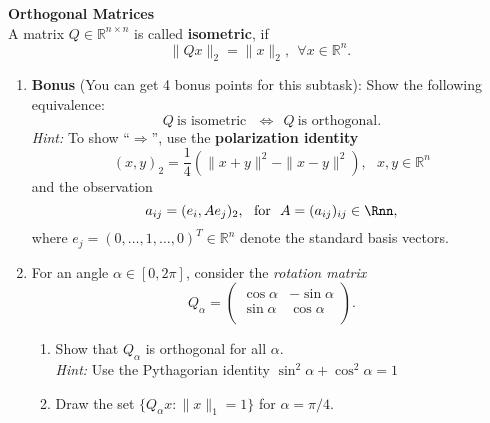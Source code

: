 \textbf{Orthogonal Matrices}\\
A matrix $Q\in\mathbb{R}^{n\times n}$ is called \textbf{isometric}, if 
$$\|Qx\|_2=\|x\|_2,  ~~\forall x\in\mathbb{R}^n.$$

\begin{enumerate}
	\item \textbf{Bonus} (You can get 4 bonus points for this subtask): Show the following equivalence:
	$$ Q   ~\text{is isometric}~~~ \Leftrightarrow~~Q~ \text{is orthogonal}.$$
	\textit{Hint:} To show ``$\Rightarrow$'', use the {\color{navy}\textbf{polarization identity}
	 $$(x,y)_2 = \frac{1}{4}\left(\|x+y\|^2 - \|x-y\|^2\right),~~~x,y \in \mathbb{R}^n $$}and the observation 
 		$$a_{ij} = (e_i, Ae_j)_2,~~ \text{for}~~A=(a_{ij})_{ij}\in\Rnn,$$
 		where $e_j=(0,\ldots, 1, \ldots, 0)^T \in \mathbb{R}^n$ denote the standard basis vectors.
	\item For an angle $\alpha \in [0,2\pi]$, consider the \textit{rotation matrix}
	$$Q_\alpha = \begin{pmatrix}
	\cos \alpha & -\sin \alpha\\
	\sin \alpha & \cos \alpha\\
	\end{pmatrix}.
	$$
	\begin{enumerate}
		\item Show that $Q_\alpha$ is orthogonal for all $\alpha$. \\
		\textit{Hint:} Use the Pythagorian identity $\sin^2\alpha + \cos^2\alpha = 1$
		\item Draw the set $\{Q_\alpha x: \|x\|_1 = 1\}$ for $\alpha = \pi/4$.
	\end{enumerate}
\end{enumerate}

